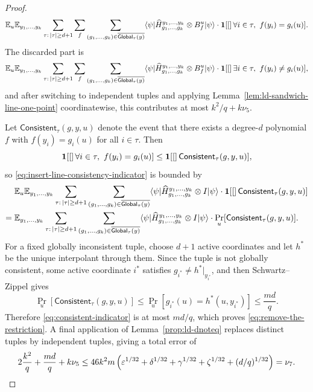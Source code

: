 \begin{proof}
\begin{equation}
		\mathbb{E}_u \mathbb{E}_{y_1,\dots,y_k} \sum_{\tau:\,|\tau|\ge d+1} \sum_f
		\sum_{(g_1,\dots,g_k)\in \overline{\mathsf{Global}_\tau(y)}}
		\langle \psi \rvert \widehat H_{g_1,\dots,g_k}^{y_1,\dots,y_k} \otimes B_f^u \lvert \psi \rangle
		\cdot \mathbf{1}\!\left[[\right]\forall i\in\tau,\ f(y_i)=g_i(u)].
	\end{equation}
	The discarded part is
	\begin{equation}\label{eq:discarded-line-inconsistency-term}
		\mathbb{E}_u \mathbb{E}_{y_1,\dots,y_k} \sum_{\tau:\,|\tau|\ge d+1} \sum_f
		\sum_{(g_1,\dots,g_k)\in \overline{\mathsf{Global}_\tau(y)}}
		\langle \psi \rvert \widehat H_{g_1,\dots,g_k}^{y_1,\dots,y_k} \otimes B_f^u \lvert \psi \rangle
		\cdot \mathbf{1}\!\left[[\right]\exists i\in\tau,\ f(y_i)\ne g_i(u)],
	\end{equation}
	and after switching to independent tuples and applying Lemma~\ref{lem:ld-sandwich-line-one-point} coordinatewise, this contributes at most $k^2/q + k\nu_5$.

	Let $\mathsf{Consistent}_\tau(g,y,u)$ denote the event that there exists a degree-$d$ polynomial $f$ with $f(y_i)=g_i(u)$ for all $i\in\tau$. Then
	\[
		\bone[\forall i\in\tau,\ f(y_i)=g_i(u)] \le \bone[\mathsf{Consistent}_\tau(g,y,u)],
	\]
	so \ref{eq:insert-line-consistency-indicator} is bounded by
	\begin{align}
		    & \mathbb{E}_u \mathbb{E}_{y_1,\dots,y_k} \sum_{\tau:\,|\tau|\ge d+1}
		\sum_{(g_1,\dots,g_k)\in \overline{\mathsf{Global}_\tau(y)}}
		\langle \psi \rvert \widehat H_{g_1,\dots,g_k}^{y_1,\dots,y_k} \otimes I \lvert \psi \rangle
		\cdot \mathbf{1}\!\left[[\right]\mathsf{Consistent}_\tau(g,y,u)]\nonumber     \\
		={} &
		\mathbb{E}_{y_1,\dots,y_k} \sum_{\tau:\,|\tau|\ge d+1}
		\sum_{(g_1,\dots,g_k)\in \overline{\mathsf{Global}_\tau(y)}}
		\langle \psi \rvert \widehat H_{g_1,\dots,g_k}^{y_1,\dots,y_k} \otimes I \lvert \psi \rangle
		\cdot \Pr_u[\mathsf{Consistent}_\tau(g,y,u)].
		\label{eq:consistent-indicator}
	\end{align}
	For a fixed globally inconsistent tuple, choose $d+1$ active coordinates and let $h^*$ be the unique interpolant through them. Since the tuple is not globally consistent, some active coordinate $i^*$ satisfies $g_{i^*} \ne h^*|_{y_{i^*}}$, and then Schwartz--Zippel gives
	\[
		\Pr_u[\mathsf{Consistent}_\tau(g,y,u)]
		\le
		\Pr_u[g_{i^*}(u)=h^*(u,y_{i^*})]
		\le
		\frac{md}{q}.
	\]
	Therefore \ref{eq:consistent-indicator} is at most $md/q$, which proves \ref{eq:remove-the-restriction}. A final application of Lemma~\ref{prop:ld-dnoteq} replaces distinct tuples by independent tuples, giving a total error of
	\[
		2\frac{k^2}{q} + \frac{md}{q} + k\nu_5
		\le
		46k^2m\left(\varepsilon^{1/32}+\delta^{1/32}+\gamma^{1/32}+\zeta^{1/32}+(d/q)^{1/32}\right)
		= \nu_7.
	\]
\end{proof}

